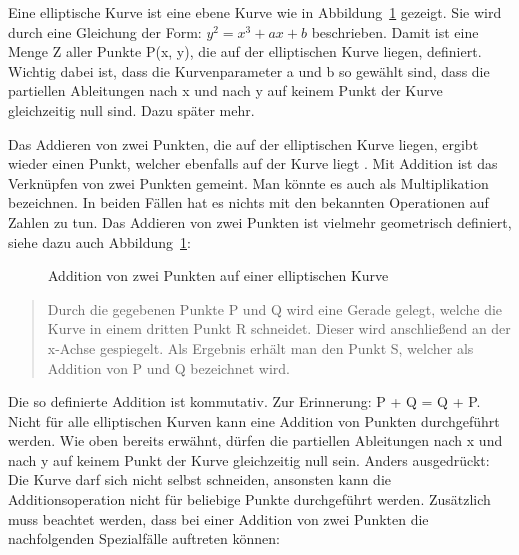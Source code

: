 		Eine elliptische Kurve ist eine ebene Kurve wie in Abbildung~\ref{ABBILDUNG_elliptischenKurveAddition} gezeigt. Sie wird durch eine Gleichung der Form: $y^2 = x^3 + ax +b$ beschrieben. Damit ist eine Menge Z aller Punkte P(x, y), die auf der elliptischen Kurve liegen, definiert. Wichtig dabei ist, dass die Kurvenparameter a und b so gewählt sind, dass die partiellen Ableitungen nach x und nach y auf keinem Punkt der Kurve gleichzeitig null sind. Dazu später mehr.
		
		Das Addieren von zwei Punkten, die auf der elliptischen Kurve liegen, ergibt wieder einen Punkt, welcher ebenfalls auf der Kurve liegt \cite{Information:und:Kommunikation}. Mit Addition ist das Verknüpfen von zwei Punkten gemeint. Man könnte es auch als Multiplikation bezeichnen. In beiden Fällen hat es nichts mit den bekannten Operationen auf Zahlen zu tun. Das Addieren von zwei Punkten ist vielmehr geometrisch definiert, siehe dazu auch Abbildung~\ref{ABBILDUNG_elliptischenKurveAddition}:
		
		\begin{figure}
			\centering
			\caption{Addition von zwei Punkten auf einer elliptischen Kurve~\cite{Information:und:Kommunikation}}
			\label{ABBILDUNG_elliptischenKurveAddition}
		\end{figure}
		
		\begin{quote}
			\begin{defi}
				Durch die gegebenen Punkte P und Q wird eine Gerade gelegt, welche die Kurve in einem dritten Punkt R schneidet. Dieser wird anschließend an der x-Achse 
				gespiegelt. Als Ergebnis erhält man den Punkt S, welcher als Addition von P und Q bezeichnet wird.\cite{Information:und:Kommunikation}
			\end{defi}
		\end{quote}
		
		Die so definierte Addition ist kommutativ. Zur Erinnerung: P + Q = Q + P. Nicht für alle elliptischen Kurven kann eine Addition von Punkten durchgeführt werden. Wie oben bereits erwähnt, dürfen die partiellen Ableitungen nach x und nach y auf keinem Punkt der Kurve gleichzeitig null sein. Anders ausgedrückt: Die Kurve darf sich nicht selbst schneiden, ansonsten kann die Additionsoperation nicht für beliebige Punkte durchgeführt werden.
		Zusätzlich muss beachtet werden, dass bei einer Addition von zwei Punkten die nachfolgenden Spezialfälle auftreten können\cite{Information:und:Kommunikation}:
		
